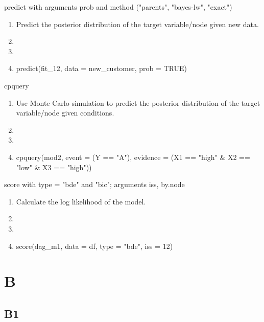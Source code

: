 \documentclass{article}
\begin{document}
predict with arguments prob and method ("parents", "bayes-lw", "exact") \begin{enumerate}[label=\alph*)]
    \item Predict the posterior distribution of the target variable/node given new data.
    \item 
    \item 
    \item predict(fit\_12, data = new\_customer, prob = TRUE)
\end{enumerate}
cpquery \begin{enumerate}[label=\alph*)]
    \item Use Monte Carlo simulation to predict the posterior distribution of the target variable/node given conditions.
    \item 
    \item 
    \item cpquery(mod2, event = (Y == "A"), evidence = (X1 == "high" \& X2 == "low" \& X3 == "high"))
\end{enumerate}
score with type = "bde" and "bic"; arguments iss, by.node \begin{enumerate}[label=\alph*)]
    \item Calculate the log likelihood of the model.
    \item 
    \item 
    \item score(dag\_m1, data = df, type = "bde", iss = 12)
\end{enumerate}

\section*{B}
\label{sec:B}

\subsection*{B1}
\label{sec:B:B1}
\end{document}

